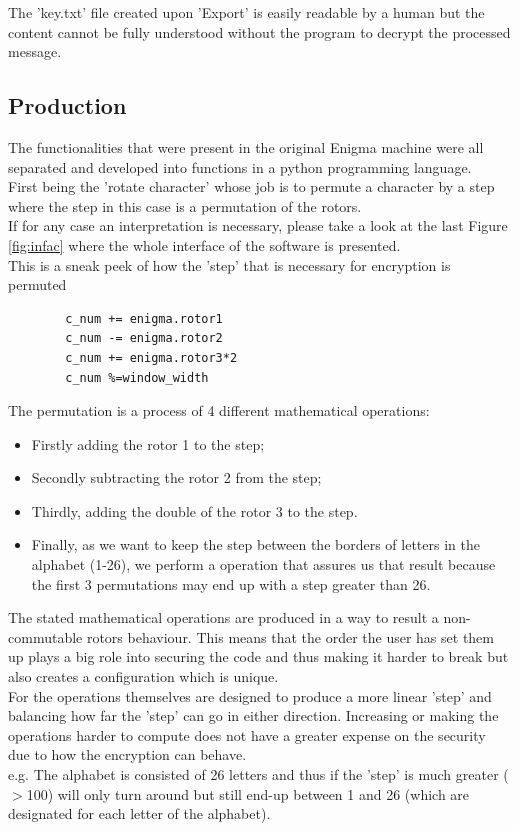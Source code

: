 \documentclass[conference,compsoc]{IEEEtran}
\begin{document}
The 'key.txt' file created upon 'Export' is easily readable by a human but the content cannot be fully understood without the program to decrypt the processed message.\\ 

\subsection{Production}

The functionalities that were present in the original Enigma machine were all separated and developed into functions in a python programming language.\\
First being the 'rotate character' whose job is to permute a character by a step where the step in this case is a permutation of the rotors.\\
If for any case an interpretation is necessary, please take a look at the last Figure \ref{fig:infac} where the whole interface of the software is presented.\\

This is a sneak peek of how the 'step' that is necessary for encryption is permuted
\begin{verbatim}
        c_num += enigma.rotor1
        c_num -= enigma.rotor2
        c_num += enigma.rotor3*2
        c_num %=window_width
\end{verbatim}
The permutation is a process of 4 different mathematical operations:\\
\begin{itemize}
    \item Firstly adding the rotor 1 to the step;\\
    \item Secondly subtracting the rotor 2 from the step;\\
    \item Thirdly, adding the double of the rotor 3 to the step.\\
    \item Finally, as we want to keep the step between the borders of letters in the alphabet (1-26), we perform a operation that assures us that result because the first 3 permutations may end up with a step greater than 26.\\
\end{itemize}

The stated mathematical operations are produced in a way to result a non-commutable rotors behaviour. This means that the order the user has set them up plays a big role into securing the code and thus making it harder to break but also creates a configuration which is unique.\\ 
For the operations themselves are designed to produce a more linear 'step' and balancing how far the 'step' can go in either direction. Increasing or making the operations harder to compute does not have a greater expense on the security due to how the encryption can behave.\\
e.g. The alphabet is consisted of 26 letters and thus if the 'step' is much greater ($>$100) will only turn around but still end-up between 1 and 26 (which are designated for each letter of the alphabet).\\
\end{document}
